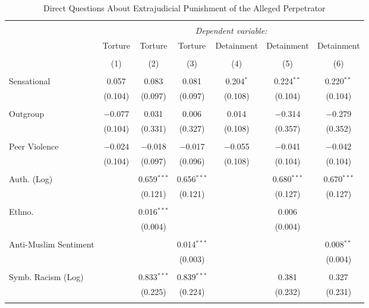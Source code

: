 
\begin{table}[H] \centering 
  \caption{Direct Questions About Extrajudicial Punishment of the Alleged Perpetrator} 
  \label{} 
\begin{tabular}{@{\extracolsep{5pt}}lcccccc} 
\\[-1.8ex]\hline 
\hline \\[-1.8ex] 
 & \multicolumn{6}{c}{\textit{Dependent variable:}} \\ 
\cline{2-7} 
 & Torture & Torture & Torture & Detainment & Detainment & Detainment \\ 
\\[-1.8ex] & (1) & (2) & (3) & (4) & (5) & (6)\\ 
\hline \\[-1.8ex] 
 Sensational & 0.057 & 0.083 & 0.081 & 0.204$^{*}$ & 0.224$^{**}$ & 0.220$^{**}$ \\ 
  & (0.104) & (0.097) & (0.097) & (0.108) & (0.104) & (0.104) \\ 
  & & & & & & \\ 
 Outgroup & $-$0.077 & 0.031 & 0.006 & 0.014 & $-$0.314 & $-$0.279 \\ 
  & (0.104) & (0.331) & (0.327) & (0.108) & (0.357) & (0.352) \\ 
  & & & & & & \\ 
 Peer Violence & $-$0.024 & $-$0.018 & $-$0.017 & $-$0.055 & $-$0.041 & $-$0.042 \\ 
  & (0.104) & (0.097) & (0.096) & (0.108) & (0.104) & (0.104) \\ 
  & & & & & & \\ 
 Auth. (Log) &  & 0.659$^{***}$ & 0.656$^{***}$ &  & 0.680$^{***}$ & 0.670$^{***}$ \\ 
  &  & (0.121) & (0.121) &  & (0.127) & (0.127) \\ 
  & & & & & & \\ 
 Ethno. &  & 0.016$^{***}$ &  &  & 0.006 &  \\ 
  &  & (0.004) &  &  & (0.004) &  \\ 
  & & & & & & \\ 
 Anti-Muslim Sentiment &  &  & 0.014$^{***}$ &  &  & 0.008$^{**}$ \\ 
  &  &  & (0.003) &  &  & (0.004) \\ 
  & & & & & & \\ 
 Symb. Racism (Log) &  & 0.833$^{***}$ & 0.839$^{***}$ &  & 0.381 & 0.327 \\ 
  &  & (0.225) & (0.224) &  & (0.232) & (0.231) \\ 
  & & & & & & \\ 

\end{tabular}
\end{table}
